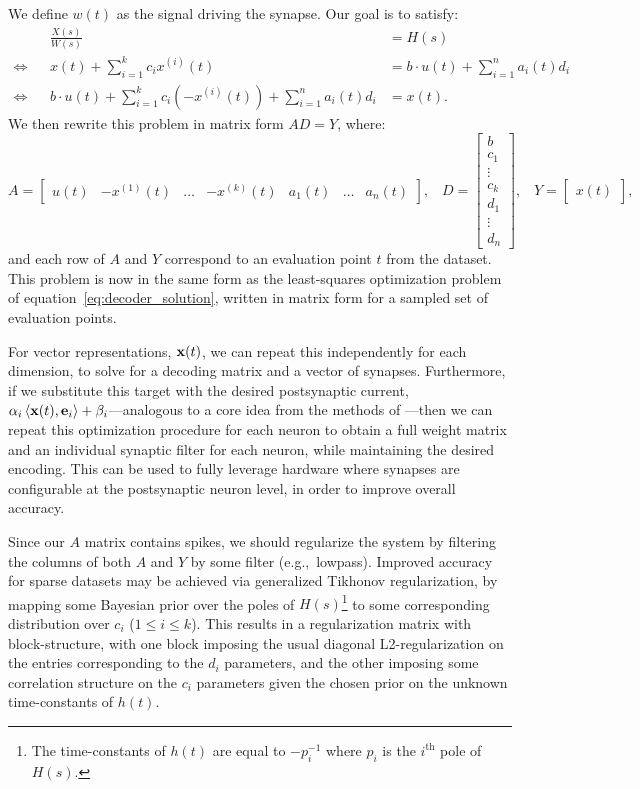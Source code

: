 We define ${w}(t)$ as the signal driving the synapse. Our goal is to satisfy:
\begin{align*}
    && \frac{{X}(s)}{{W}(s)} &= H(s) \\
    \iff && {x}(t) + \sum_{i=1}^k c_i {x}^{(i)}(t) &= {b} \cdot {u}(t) + \sum_{i=1}^n a_i(t) {d}_i \\
    \iff && {b} \cdot {u}(t) + \sum_{i=1}^k c_i \left(-{x}^{(i)}(t)\right) + \sum_{i=1}^n a_i(t) {d}_i &= {x}(t) \text{.}
\end{align*}
We then rewrite this problem in matrix form $AD = Y$, where:
$$A = \left[ \begin{matrix} {u}(t) & -{x}^{(1)}(t) & \ldots & -{x}^{(k)}(t) & a_1(t) & \ldots & a_n(t)  \end{matrix} \right] \text{,} \quad D = \left[ \begin{matrix} {b} \\ c_1 \\ \vdots \\ c_k \\ d_1 \\ \vdots \\ d_n \end{matrix} \right] \text{,} \quad Y = \left[ \begin{matrix} {x}(t) \end{matrix} \right]\text{,}$$
and each row of $A$ and $Y$ correspond to an evaluation point $t$ from the dataset.
This problem is now in the same form as the least-squares optimization problem of equation~\ref{eq:decoder_solution}, written in matrix form for a sampled set of evaluation points.

For vector representations, $\mathbf{x}(t)$, we can repeat this independently for each dimension, to solve for a decoding matrix and a vector of synapses. 
Furthermore, if we substitute this target with the desired postsynaptic current, $\alpha_i \left \langle \mathbf{x}(t)\text{,}\, \mathbf{e}_i \right \rangle + \beta_i$---analogous to a core idea from the methods of \citet{tripp2006neural, stoeckel2018}---then we can repeat this optimization procedure for each neuron to obtain a full weight matrix and an individual synaptic filter for each neuron, while maintaining the desired encoding.
This can be used to fully leverage hardware where synapses are configurable at the postsynaptic neuron level, in order to improve overall accuracy.

Since our $A$ matrix contains spikes, we should regularize the system by filtering the columns of both $A$ and $Y$ by some filter (e.g.,~lowpass).
Improved accuracy for sparse datasets may be achieved via generalized Tikhonov regularization, by mapping some Bayesian prior over the poles of $H(s)$\footnote{%
The time-constants of $h(t)$ are equal to $-p_i^{-1}$ where $p_i$ is the $i^\text{th}$ pole of $H(s)$.} to some corresponding distribution over $c_i$ ($1 \le i \le k$).
This results in a regularization matrix with block-structure, with one block imposing the usual diagonal L2-regularization on the entries corresponding to the $d_i$ parameters, and the other imposing some correlation structure on the $c_i$ parameters given the chosen prior on the unknown time-constants of $h(t)$.

